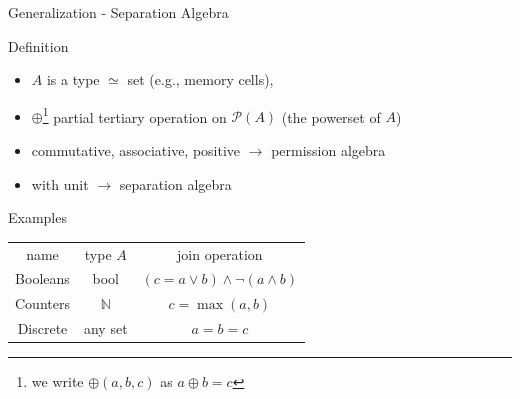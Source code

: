 \documentclass{beamer}
\begin{document}
\begin{frame} {Generalization - Separation Algebra}
   \begin{block}{Definition}
      \begin{itemize}
         \item $A$ is a type $\simeq$ set (e.g., memory cells),
         \item $\oplus$\footnote{we write $\oplus(a,b,c)$ as $a \oplus b = c$} partial tertiary operation on $\mathcal{P}(A)$ (the powerset of $A$)
         \item commutative, associative, positive $\to$ permission algebra
         \item with unit $\to$ separation algebra
      \end{itemize}
   \end{block}
   \begin{block}{Examples}
      \begin{table}
         \begin{tabular}{c c c }
            name     & type $A$     & join operation                         \\
            Booleans & bool         & $(c = a \lor b) \land \neg(a \land b)$ \\
            Counters & $\mathbb{N}$ & $c =\max(a,b)$                         \\
            Discrete & any set      & $a = b = c$                            \\
         \end{tabular}
      \end{table}
   \end{block}
\end{frame}
\end{document}
